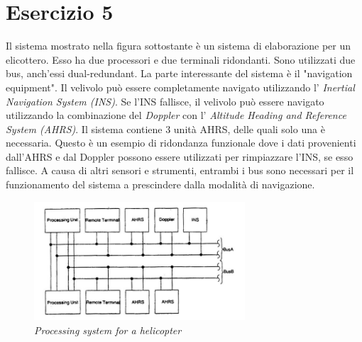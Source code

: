 \section{Esercizio 5}
Il sistema mostrato nella figura sottostante è un sistema di elaborazione per un elicottero. Esso ha due processori e due terminali ridondanti. Sono utilizzati due bus, anch'essi dual-redundant. La parte interessante del sistema è il "navigation equipment". Il velivolo può essere completamente navigato utilizzando l' \textit{Inertial Navigation System (INS)}. Se l'INS fallisce, il velivolo può essere navigato utilizzando la combinazione del \textit{Doppler} con l' \textit{Altitude Heading and Reference System (AHRS)}. Il sistema contiene 3 unità AHRS, delle quali solo una è necessaria. Questo è un esempio di ridondanza funzionale dove i dati provenienti dall'AHRS e dal Doppler possono essere utilizzati per rimpiazzare l'INS, se esso fallisce. A causa di altri sensori e strumenti, entrambi i bus sono necessari per il funzionamento del sistema a prescindere dalla modalità di navigazione.
\begin{figure}[H]
	\centering
	\includegraphics[width=0.7\textwidth]{img/hw5/es5_traccia.png}
	\caption{\textit{Processing system for a helicopter}}
\end{figure}
